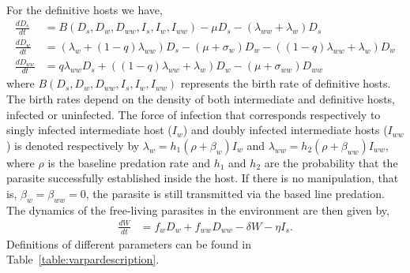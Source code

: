 \documentclass[a4paper]{scrartcl}
\begin{document}
For the definitive hosts we have,
%
\begin{align}
\frac{dD_s}{dt} &= B(D_s,  D_w,  D_{ww},  I_s, I_w, I_{ww})  - \mu D_s - (\lambda_{ww} + \lambda_w) D_s \nonumber \\    
\frac{dD_w}{dt} &= (\lambda_w + (1 - q) \lambda_{ww}) D_s - (\mu + \sigma_w) D_w - ((1 - q) \lambda_{ww} + \lambda_w) D_w  \label{odes:dhosts} \\         
\frac{dD_{ww}}{dt} &= q \lambda_{ww} D_s + ((1 - q) \lambda_{ww} + \lambda_w) D_w - (\mu + \sigma_{ww}) D_{ww} \nonumber
\end{align}
%
where $B(D_s, D_w, D_{ww}, I_s, I_w, I_{ww})$ represents the birth rate of definitive hosts.
The birth rates depend on the density of both intermediate and definitive hosts, infected or uninfected. 
The force of infection that corresponds respectively to singly infected intermediate host ($I_w$) and doubly infected intermediate hosts ($I_{ww}$) is denoted respectively by $\lambda_w = h_1 (\rho + \beta_w)  I_w$ and $\lambda_{ww} = h_2 (\rho + \beta_{ww}) I_{ww}$, where $\rho$ is the baseline predation rate and $h_1$ and $h_2$ are the probability that the parasite successfully established inside the host.
If there is no manipulation, that is, $\beta_w = \beta_{ww} = 0$, the parasite is still transmitted via the based line predation. 
The dynamics of the free-living parasites in the environment are then given by,
\begin{align}
	\frac{dW}{dt} &= f_w D_w + f_{ww} D_{ww} - \delta W - \eta I_s. \label{odes:eparasite}
\end{align}
%
Definitions of different parameters can be found in Table~\ref{table:varpardescription}.
\end{document}
